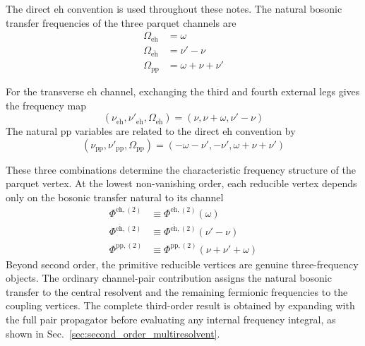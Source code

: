 \documentclass[aip,jcp,reprint,noshowkeys,superscriptaddress]{revtex4-1}
\newcommand{\eh}{\text{eh}}
\newcommand{\teh}{\overline{\text{eh}}}
\newcommand{\pp}{\text{pp}}
\begin{document}
The direct $\eh$ convention is used throughout these notes.
The natural bosonic transfer frequencies of the three parquet channels are\cite{OrlandoRomanielloLoos2023,MarieLoos2025}
\begin{align}
	\Omega_\eh
	&=
	\omega
	\label{eq:Omega_eh}
	\\
	\Omega_{\teh}
	&=
	\nu'-\nu
	\label{eq:Omega_ehbar}
	\\
	\Omega_\pp
	&=
	\omega+\nu+\nu'
	\label{eq:Omega_pp}
\end{align}

For the transverse $\eh$ channel, exchanging the third and fourth external
legs gives the frequency map
\begin{equation}
	\left(
	\nu_{\teh},
	\nu'_{\teh},
	\Omega_{\teh}
	\right)
	=
	\left(
	\nu,
	\nu+\omega,
	\nu'-\nu
	\right)
	\label{eq:crossed_frequency_map}
\end{equation}
The natural $\pp$ variables are related to the direct $\eh$ convention by
\begin{equation}
	\left(
	\nu_\pp,
	\nu'_\pp,
	\Omega_\pp
	\right)
	=
	\left(
	-\omega-\nu',
	-\nu',
	\omega+\nu+\nu'
	\right)
	\label{eq:pp_frequency_map}
\end{equation}

These three combinations determine the characteristic frequency structure of
the parquet vertex.
At the lowest non-vanishing order, each reducible vertex depends only on the
bosonic transfer natural to its channel
\begin{align}
	\Phi^{\eh,(2)}
	&\equiv
	\Phi^{\eh,(2)}(\omega)
	\\
	\Phi^{\teh,(2)}
	&\equiv
	\Phi^{\teh,(2)}(\nu'-\nu)
	\\
	\Phi^{\pp,(2)}
	&\equiv
	\Phi^{\pp,(2)}(\nu+\nu'+\omega)
	\label{eq:Phi_frequency_second_order}
\end{align}
Beyond second order, the primitive reducible vertices are genuine
three-frequency objects.
The ordinary channel-pair contribution assigns the natural bosonic transfer
to the central resolvent and the remaining fermionic frequencies to the
coupling vertices. The complete third-order result is obtained by expanding
with the full pair propagator before evaluating any internal frequency
integral, as shown in Sec.~\ref{sec:second_order_multiresolvent}.
\end{document}
